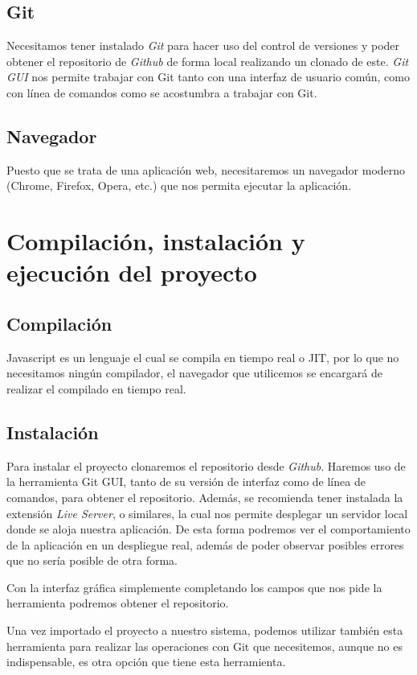 \subsection{Git}
Necesitamos tener instalado \emph{Git} para hacer uso del control de versiones y poder obtener el repositorio de \emph{Github} de forma local realizando un clonado de este. \emph{Git GUI} nos permite trabajar con Git tanto con una interfaz de usuario común, como con línea de comandos como se acostumbra a trabajar con Git.

\subsection{Navegador}
Puesto que se trata de una aplicación web, necesitaremos un navegador moderno (Chrome, Firefox, Opera, etc.) que nos permita ejecutar la aplicación.

\section{Compilación, instalación y ejecución del proyecto}

\subsection{Compilación}
Javascript es un lenguaje el cual se compila en tiempo real o JIT\cite{wiki:jit}, por lo que no necesitamos ningún compilador, el navegador que utilicemos se encargará de realizar el compilado en tiempo real.

\subsection{Instalación}
Para instalar el proyecto clonaremos el repositorio desde \emph{Github}. Haremos uso de la herramienta Git GUI, tanto de su versión de interfaz como de línea de comandos, para obtener el repositorio. Además, se recomienda tener instalada la extensión \emph{Live Server}, o similares, la cual nos permite desplegar un servidor local donde se aloja nuestra aplicación. De esta forma podremos ver el comportamiento de la aplicación en un despliegue real, además de poder observar posibles errores que no sería posible de otra forma.

Con la interfaz gráfica simplemente completando los campos que nos pide la herramienta podremos obtener el repositorio.

Una vez importado el proyecto a nuestro sistema, podemos utilizar también esta herramienta para realizar las operaciones con Git que necesitemos, aunque no es indispensable, es otra opción que tiene esta herramienta.


